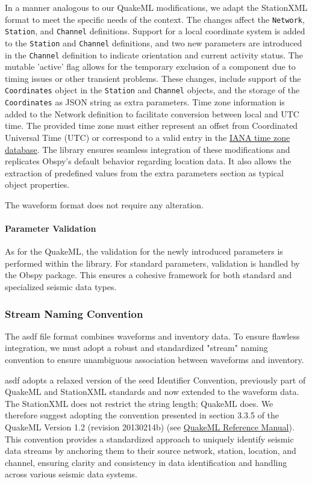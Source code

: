 In a manner analogous to our QuakeML modifications, we adapt the StationXML format to meet the specific needs of the \museismic context. The changes affect the \texttt{Network}, \texttt{Station}, and \texttt{Channel} definitions. Support for a local coordinate system is added to the \texttt{Station} and \texttt{Channel} definitions, and two new parameters are introduced in the \texttt{Channel} definition to indicate orientation and current activity status. The mutable 'active' flag allows for the temporary exclusion of a component due to timing issues or other transient problems. These changes, include support of the \texttt{Coordinates} object in the \texttt{Station} and \texttt{Channel} objects, and the storage of the \texttt{Coordinates} as JSON string as extra parameters. Time zone information is added to the Network definition to facilitate conversion between local and UTC time. The provided time zone must either represent an offset from Coordinated Universal Time (UTC) or correspond to a valid entry in the \href{https://www.iana.org/time-zones}{IANA time zone database}. The \muquake library ensures seamless integration of these modifications and replicates Obspy's default behavior regarding location data. It also allows the extraction of predefined values from the extra parameters section as typical object properties.

The waveform format does not require any alteration.

\paragraph{Parameter Validation}
As for the QuakeML, the validation for the newly introduced parameters is performed within the \muquake library. For standard parameters, validation is handled by the Obspy package. This ensures a cohesive framework for both standard and specialized seismic data types.

\subsubsection{Stream Naming Convention}

The \gls{asdf} file format combines waveforms and inventory data. To ensure flawless integration, we must adopt a robust and standardized "stream" naming convention to ensure unambiguous association between waveforms and inventory. 

\gls{asdf} adopts a relaxed version of the \gls{seed} Identifier Convention, previously part of QuakeML and StationXML standards and now extended to the waveform data. The StationXML does not restrict the string length; QuakeML does. We therefore suggest adopting the convention presented in section 3.3.5 of the QuakeML Version 1.2 (revision 20130214b) (see \href{https://quake.ethz.ch/quakeml/docs/latest?action=AttachFile&do=get&target=QuakeML-BED.pdf}{QuakeML Reference Manual}). This convention provides a standardized approach to uniquely identify seismic data streams by anchoring them to their source network, station, location, and channel, ensuring clarity and consistency in data identification and handling across various seismic data systems.

